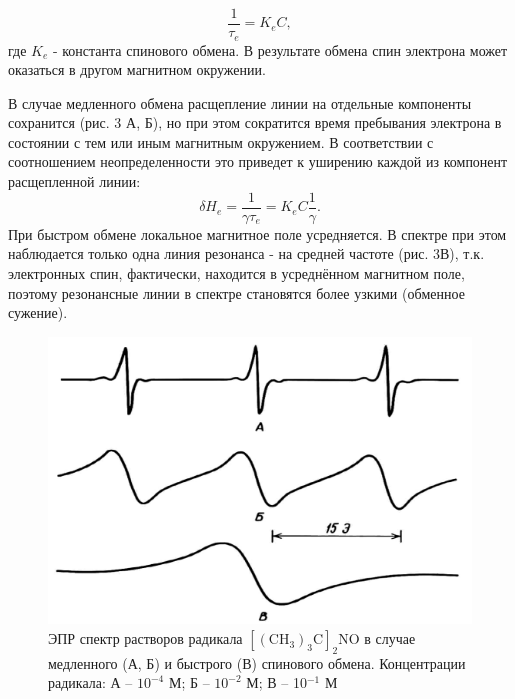 \documentclass[a4paper,14pt]{article}
\begin{document}
\begin{equation}
	\frac{1}{\tau_e}=K_e C,
\end{equation}
где $ K_e $ - константа спинового обмена. В результате обмена спин электрона может оказаться в другом магнитном окружении.
\par
В случае медленного обмена расщепление линии на отдельные компоненты сохранится (рис. 3 А, Б), но при этом сократится время пребывания электрона в состоянии с тем или иным магнитным окружением. В соответствии с соотношением неопределенности это приведет к уширению каждой из компонент расщепленной линии:
\begin{equation}
	\delta H_e = \frac{1}{\gamma \tau_e}=K_e C \frac{1}{\gamma}.
\end{equation}
При быстром обмене локальное магнитное поле усредняется. В спектре при этом наблюдается только одна линия резонанса - на средней частоте (рис. 3В), т.к. электронных спин, фактически, находится в усреднённом магнитном поле, поэтому резонансные линии в спектре становятся более узкими (обменное сужение).
\begin{figure}[h]
	\centering
	\includegraphics{рис3}
	\caption{ЭПР спектр растворов радикала $ \mathrm{[(CH_3)_3C]_2NO} $ в случае медленного (А, Б) и быстрого (В) спинового обмена. Концентрации радикала: А – $ 10^{-4} $ М; Б – $ 10^{-2} $ М; В – 10$^ {-1} $ М}
	\label{fig:3}
\end{figure}
\end{document}
